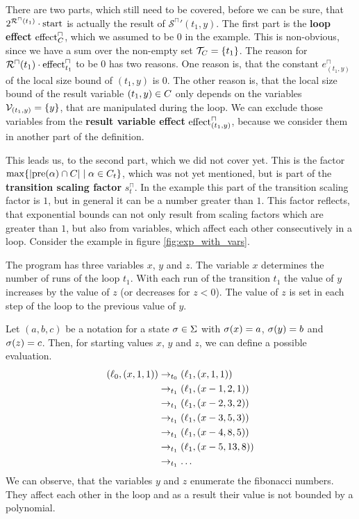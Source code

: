 There are two parts, which still need to be covered, before we can be sure, that $2^{{\mathcal{R}^\sqcap}(t_1)} \cdot \text{start}$ is actually the result of ${\mathcal{S}^\sqcap}'(t_1,y)$.
The first part is the \textbf{loop effect} $\text{effect}^\sqcap_C$, which we assumed to be $0$ in the example.
This is non-obvious, since we have a sum over the non-empty set $\mathcal{T}_C = \lbrace t_1 \rbrace$.
The reason for ${\mathcal{R}^\sqcap}(t_1) \cdot \text{effect}^\sqcap_{t_1}$ to be $0$ has two reasons.
One reason is, that the constant $e^\sqcap_{(t_1,y)}$ of the local size bound of $(t_1,y)$ is $0$.
The other reason is, that the local size bound of the result variable $(t_1,y) \in C$ only depends on the variables $\mathcal{V}_{(t_1,y)} = \lbrace y \rbrace$, that are manipulated during the loop.
We can exclude those variables from the \textbf{result variable effect} $\text{effect}^\sqcap_{(t_1,y)}$, because we consider them in another part of the definition.

This leads us, to the second part, which we did not cover yet.
This is the factor $\max \lbrace \left|\text{pre}(\alpha) \cap C\right| \mid \alpha \in C_t \rbrace$, which was not yet mentioned, but is part of the \textbf{transition scaling factor} $s^\sqcap_t$.
In the example this part of the transition scaling factor is $1$, but in general it can be a number greater than $1$.
This factor reflects, that exponential bounds can not only result from scaling factors which are greater than $1$, but also from variables, which affect each other consecutively in a loop.
Consider the example in figure \ref{fig:exp_with_vars}.



The program has three variables $x$, $y$ and $z$.
The variable $x$ determines the number of runs of the loop $t_1$.
With each run of the transition $t_1$ the value of $y$ increases by the value of $z$ (or decreases for $z < 0$).
The value of $z$ is set in each step of the loop to the previous value of $y$.

Let $(a,b,c)$ be a notation for a state $\sigma \in \Sigma$ with $\sigma(x) = a$, $\sigma(y) = b$ and $\sigma(z) = c$.
Then, for starting values $x$, $y$ and $z$, we can define a possible evaluation.
\begin{align*}
  (\ell_0, (x,1,1)) & \rightarrow_{t_0} (\ell_1, (x,1,1)) \\
  & \rightarrow_{t_1} (\ell_1, (x-1,2,1)) \\
  & \rightarrow_{t_1} (\ell_1, (x-2,3,2)) \\
  & \rightarrow_{t_1} (\ell_1, (x-3,5,3)) \\
  & \rightarrow_{t_1} (\ell_1, (x-4,8,5)) \\
  & \rightarrow_{t_1} (\ell_1, (x-5,13,8)) \\
  & \rightarrow_{t_1} \dots
\end{align*}
We can observe, that the variables $y$ and $z$ enumerate the fibonacci numbers.
They affect each other in the loop and as a result their value is not bounded by a polynomial.

